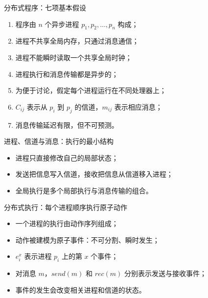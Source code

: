 \documentclass[UTF8,fontset=none,aspectratio=169,10pt]{beamer}
\begin{document}
\begin{frame}{分布式程序：七项基本假设}
\small
\begin{enumerate}
  \item 程序由 $n$ 个异步进程 $p_1,p_2,\ldots,p_n$ 构成；
  \item 进程不共享全局内存，只通过消息通信；
  \item 进程不能瞬时读取一个共享全局时钟；
  \item 进程执行和消息传输都是异步的；
  \item 为便于讨论，假定每个进程运行在不同处理器上；
  \item $C_{ij}$ 表示从 $p_i$ 到 $p_j$ 的信道，$m_{ij}$ 表示相应消息；
  \item 消息传输延迟有限，但不可预测。
\end{enumerate}
\vfill
{}
\end{frame}

\begin{frame}{进程、信道与消息：执行的最小结构}
\begin{center}
\end{center}
\vfill
\begin{itemize}
  \item 进程只直接修改自己的局部状态；
  \item 发送把信息写入信道，接收把信息从信道移入进程；
  \item 全局执行是多个局部执行与消息传输的组合。
\end{itemize}
\end{frame}

\begin{frame}{分布式执行：每个进程顺序执行原子动作}
\begin{itemize}
  \item 一个进程的执行由动作序列组成；
  \item 动作被建模为原子事件：不可分割、瞬时发生；
  \item $e_i^x$ 表示进程 $p_i$ 上的第 $x$ 个事件；
  \item 对消息 $m$，$send(m)$ 和 $rec(m)$ 分别表示发送与接收事件；
  \item 事件的发生会改变相关进程和信道的状态。
\end{itemize}
\vfill
\begin{center}
\end{center}
\end{frame}
\end{document}
